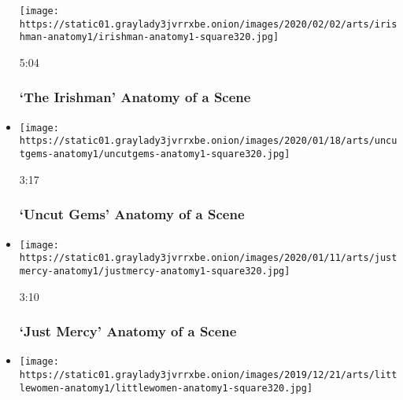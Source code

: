 \begin{itemize}
  \texttt{[image: https://static01.graylady3jvrrxbe.onion/images/2020/02/02/arts/irishman-anatomy1/irishman-anatomy1-square320.jpg]}

  5:04

  \hypertarget{the-irishman--anatomy-of-a-scene}{%
  \subsubsection{`The Irishman' \textbar{} Anatomy of a
  Scene}\label{the-irishman--anatomy-of-a-scene}}
\item
  \href{https://www.nytimes3xbfgragh.onion/video/movies/100000006924955/uncut-gems-scene.html?action=click\&module=video-series-bar\&region=header\&pgtype=Article\&playlistId=video/anatomy-of-a-scene}{}

  \texttt{[image: https://static01.graylady3jvrrxbe.onion/images/2020/01/18/arts/uncutgems-anatomy1/uncutgems-anatomy1-square320.jpg]}

  3:17

  \hypertarget{uncut-gems--anatomy-of-a-scene}{%
  \subsubsection{`Uncut Gems' \textbar{} Anatomy of a
  Scene}\label{uncut-gems--anatomy-of-a-scene}}
\item
  \href{https://www.nytimes3xbfgragh.onion/video/movies/100000006912732/just-mercy-scene.html?action=click\&module=video-series-bar\&region=header\&pgtype=Article\&playlistId=video/anatomy-of-a-scene}{}

  \texttt{[image: https://static01.graylady3jvrrxbe.onion/images/2020/01/11/arts/justmercy-anatomy1/justmercy-anatomy1-square320.jpg]}

  3:10

  \hypertarget{just-mercy--anatomy-of-a-scene}{%
  \subsubsection{`Just Mercy' \textbar{} Anatomy of a
  Scene}\label{just-mercy--anatomy-of-a-scene}}
\item
  \href{https://www.nytimes3xbfgragh.onion/video/movies/100000006884639/little-women-scene.html?action=click\&module=video-series-bar\&region=header\&pgtype=Article\&playlistId=video/anatomy-of-a-scene}{}

  \texttt{[image: https://static01.graylady3jvrrxbe.onion/images/2019/12/21/arts/littlewomen-anatomy1/littlewomen-anatomy1-square320.jpg]}


\end{itemize}
